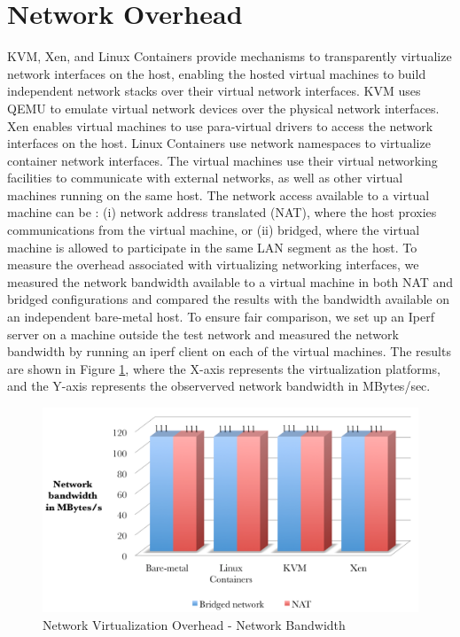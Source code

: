 \section{Network Overhead}

KVM, Xen, and Linux Containers provide mechanisms to transparently virtualize network interfaces on the host, enabling the hosted virtual machines to build independent network stacks over their virtual network interfaces. KVM uses QEMU to emulate virtual network devices over the physical network interfaces. Xen enables virtual machines to use para-virtual drivers to access the network interfaces on the host. Linux Containers use network namespaces to virtualize container network interfaces. The virtual machines use their virtual networking facilities to communicate with external networks, as well as other virtual machines running on the same host. The network access available to a virtual machine can be : (i) network address translated (NAT), where the host proxies communications from the virtual machine, or  (ii) bridged, where the virtual machine is allowed to participate in the same LAN segment as the host. To measure the overhead associated with virtualizing networking interfaces, we measured the network bandwidth available to a virtual machine in both NAT and bridged configurations and compared the results with the bandwidth available on an independent bare-metal host. To ensure fair comparison, we set up an Iperf \cite{iperf} server on a machine outside the test network and measured the network bandwidth by running an iperf client on each of the virtual machines. The results are shown in Figure \ref{fig:net1}, where the X-axis represents the virtualization platforms, and the Y-axis represents the observerved network bandwidth in MBytes/sec.

\begin{figure}[H]
\centering
\includegraphics[width=130mm]{net1.png}
\caption{Network Virtualization Overhead - Network Bandwidth}
\label{fig:net1}
\end{figure}

